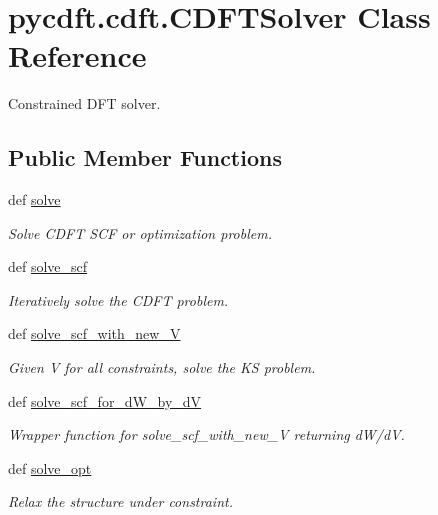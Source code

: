 \hypertarget{classpycdft_1_1cdft_1_1CDFTSolver}{\section{pycdft.\-cdft.\-C\-D\-F\-T\-Solver Class Reference}
\label{classpycdft_1_1cdft_1_1CDFTSolver}
}


Constrained D\-F\-T solver.  


\subsection*{Public Member Functions}
\begin{DoxyCompactItemize}
\item 
def \hyperlink{classpycdft_1_1cdft_1_1CDFTSolver_a972c67995d1d7a27dde9d4eb6f749821}{solve}
\begin{DoxyCompactList}\small\item\em Solve C\-D\-F\-T S\-C\-F or optimization problem. \end{DoxyCompactList}\item 
def \hyperlink{classpycdft_1_1cdft_1_1CDFTSolver_aab6b001aca774c7c6ef40e983c52433a}{solve\-\_\-scf}
\begin{DoxyCompactList}\small\item\em Iteratively solve the C\-D\-F\-T problem. \end{DoxyCompactList}\item 
def \hyperlink{classpycdft_1_1cdft_1_1CDFTSolver_a20e51ed93020505d046f1fdef0da8414}{solve\-\_\-scf\-\_\-with\-\_\-new\-\_\-\-V}
\begin{DoxyCompactList}\small\item\em Given V for all constraints, solve the K\-S problem. \end{DoxyCompactList}\item 
def \hyperlink{classpycdft_1_1cdft_1_1CDFTSolver_a28308930ffe9dd1e63019893aafd42f3}{solve\-\_\-scf\-\_\-for\-\_\-d\-W\-\_\-by\-\_\-d\-V}
\begin{DoxyCompactList}\small\item\em Wrapper function for solve\-\_\-scf\-\_\-with\-\_\-new\-\_\-\-V returning d\-W/d\-V. \end{DoxyCompactList}\item 
def \hyperlink{classpycdft_1_1cdft_1_1CDFTSolver_a614f82937b3bb796928dadf367d74171}{solve\-\_\-opt}
\begin{DoxyCompactList}\small\item\em Relax the structure under constraint. \end{DoxyCompactList}\end{DoxyCompactItemize}
